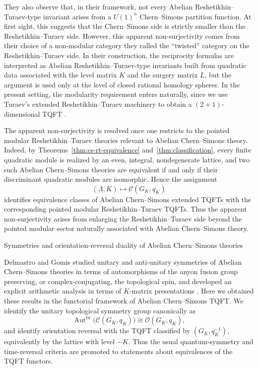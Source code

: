 \documentclass[12pt]{amsart}
\makeatletter
\renewcommand\section{\@startsection{section}{1}%
  \z@{.7\linespacing\@plus\linespacing}{.5\linespacing}%
  {\normalfont\bfseries\centering}}
\numberwithin{equation}{section}
\theoremstyle{definition}
\makeatother
\begin{document}
They also observe that, in their framework, not every Abelian Reshetikhin--Turaev-type invariant arises from a $U(1)^n$ Chern--Simons partition function. At first sight, this suggests that the Chern--Simons side is strictly smaller than the Reshetikhin--Turaev side. However, this apparent non-surjectivity comes from their choice of a non-modular category they called the “twisted” category on the Reshetikhin--Turaev side. In their construction, the reciprocity formulas are interpreted as Abelian Reshetikhin--Turaev-type invariants built from quadratic data associated with the level matrix $K$ and the surgery matrix $L$, but the argument is used only at the level of closed rational homology spheres. In the present setting, the modularity requirement enters naturally, since we use Turaev’s extended Reshetikhin--Turaev machinery to obtain a $(2+1)$-dimensional TQFT \cite{Turaev1994}.


The apparent non-surjectivity is resolved once one restricts to the pointed modular Reshetikhin--Turaev theories relevant to Abelian Chern--Simons theory. Indeed, by Theorems~\ref{thm:cs-rt-equivalence} and~\ref{thm:classification}, every finite quadratic module is realized by an even, integral, nondegenerate lattice, and two such Abelian Chern--Simons theories are equivalent if and only if their discriminant quadratic modules are isomorphic. Hence the assignment
$$
(\Lambda,K)\longmapsto \mathcal C(G_K,q_K)
$$
identifies equivalence classes of Abelian Chern--Simons extended TQFTs with the corresponding pointed modular Reshetikhin--Turaev TQFTs. Thus the apparent non-surjectivity arises from enlarging the Reshetikhin--Turaev side beyond the pointed modular sector naturally associated with Abelian Chern--Simons theory.

\section{Symmetries and orientation-reversal duality of Abelian Chern--Simons theories}
\label{sec:symmetries}

Delmastro and Gomis studied unitary and anti-unitary symmetries of Abelian Chern--Simons theories in terms of automorphisms of the anyon fusion group preserving, or complex-conjugating, the topological spin, and developed an explicit arithmetic analysis in terms of $K$-matrix presentations \cite{Delmas2021}. Here we obtained these results in the functorial framework of Abelian Chern--Simons TQFT.  We identify the unitary topological symmetry group canonically as
$$
\operatorname{Aut}^{\mathrm{br}}\!\bigl(\mathcal C(G_K,q_K)\bigr)
\cong
\mathcal{O}(G_K,q_K),
$$
and identify orientation reversal with the TQFT classified by $(G_K,q_K^{-1}),$ equivalently by the lattice with level $-K$. Thus the usual quantum-symmetry and time-reversal criteria are promoted to statements about equivalences of the TQFT functors.
\end{document}
